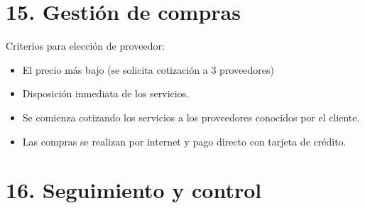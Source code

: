 \documentclass[11pt]{charter}
\begin{document}
\section{15. Gestión de compras}
\label{sec:compras}

Criterios para elección de proveedor:
\begin{itemize}
  \item El precio más bajo (se solicita cotización a 3 proveedores)
  \item Disposición inmediata de los servicios.
  \item Se comienza cotizando los servicios a los proveedores conocidos por el cliente.
  \item Las compras se realizan por internet y pago directo con tarjeta de crédito.
\end{itemize}

\section{16. Seguimiento y control}
\label{sec:seguimiento}
\end{document}

